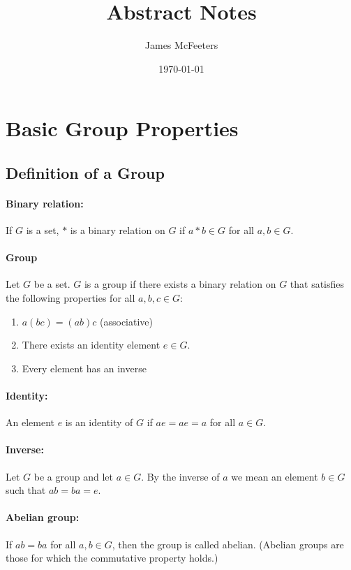 \documentclass[11pt, letterpaper]{article}
\begin{document}
\title{Abstract Notes}
\author{James McFeeters}
\date{\today}
\maketitle

\section{Basic Group Properties}
	\subsection{Definition of a Group}
		\paragraph{Binary relation:}
			If $G$ is a set, $*$ is a binary relation on $G$ if $a*b \in G$ for all $a, b \in G$.

		\paragraph{Group}
			Let $G$ be a set.
			$G$ is a group if there exists a binary relation on $G$ that satisfies the following properties for all $a, b, c \in G$:
			\begin{enumerate}
				\item $a (bc) = (ab) c$ (associative) 
				\item There exists an identity element $e \in G$.
				\item Every element has an inverse
			\end{enumerate}

		\paragraph{Identity:}
			An element $e$ is an identity of $G$ if $ae = ae = a$ for all $a \in G$.

		\paragraph{Inverse:}
			Let $G$ be a group and let $a \in G$.
			By the inverse of $a$ we mean an element $b \in G$ such that $ab = ba = e$.

		\paragraph{Abelian group:}
			If $ab = ba$ for all $a, b \in G$, then the group is called abelian.
			(Abelian groups are those for which the commutative property holds.)
\end{document}

